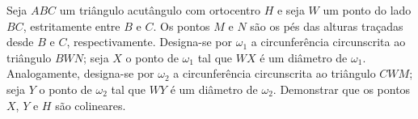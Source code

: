 Seja $ABC$ um triângulo acutângulo com ortocentro $H$ e seja $W$ um ponto do lado $BC$, estritamente entre $B$ e $C$.
Os pontos $M$ e $N$ são os pés das alturas traçadas desde $B$ e $C$, respectivamente.
Designa-se por $\omega_1$ a circunferência circunscrita ao triângulo $BWN$; seja $X$ o ponto de $\omega_1$ tal que $WX$ é um diâmetro de $\omega_1$.
Analogamente, designa-se por $\omega_2$ a circunferência circunscrita ao triângulo $CWM$; seja $Y$ o ponto de $\omega_2$ tal que $WY$ é um diâmetro de $\omega_2$.
Demonstrar que os pontos $X$, $Y$ e $H$ são colineares.
